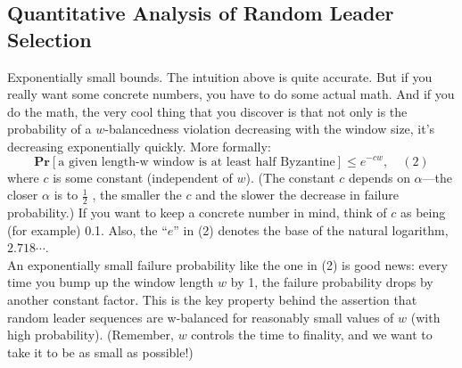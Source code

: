 \subsection{Quantitative Analysis of Random Leader Selection}
Exponentially small bounds. The intuition above is quite accurate. But if you really
want some concrete numbers, you have to do some actual math. And if you do the math,
the very cool thing that you discover is that not only is the probability of a $w$-balancedness
violation decreasing with the window size, it’s decreasing exponentially quickly. More formally:
$$\textbf{Pr}[\text{a given length-w window is at least half Byzantine}] \leq e^{-cw}, \quad(2)$$
where $c$ is some constant (independent of $w$). (The constant $c$ depends on $\alpha$—the closer $\alpha$
is to $\frac{1}{2}$ , the smaller the $c$ and the slower the decrease in failure probability.) If you want to
keep a concrete number in mind, think of $c$ as being (for example) 0.1. Also, the “$e$” in (2)
denotes the base of the natural logarithm, $2.718 \cdots$.\\
An exponentially small failure probability like the one in (2) is good news: every time you
bump up the window length $w$ by 1, the failure probability drops by another constant factor.
This is the key property behind the assertion that random leader sequences are w-balanced
for reasonably small values of $w$ (with high probability). (Remember, $w$ controls the time
to finality, and we want to take it to be as small as possible!)\\

